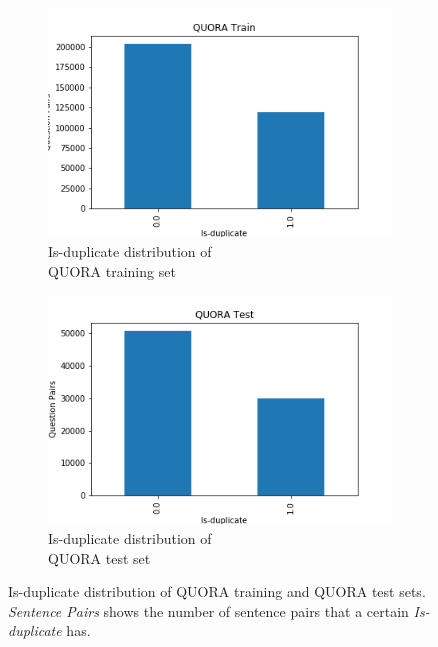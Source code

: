 \begin{enumerate}
 \begin{figure}
 	\captionsetup[subfigure]{justification=centering}
 	\centering
 	\begin{subfigure}[b]{.5\textwidth}
 		\centering
 		\includegraphics[width=\textwidth]{figures/semantic_textual_similarity/introduction/quora_train.png}
 		\caption{Is-duplicate distribution of \\ QUORA training set}
 		\label{fig:quora_train_is_duplicate}
 	\end{subfigure}%
 	\begin{subfigure}[b]{.5\textwidth}
 		\centering
 		\includegraphics[width=\textwidth]{figures/semantic_textual_similarity/introduction/quora_test.png}
 		\caption{Is-duplicate distribution of \\ QUORA test set}
 		\label{fig:quora_test_is_duplicate}
 	\end{subfigure}
 	\caption[Is-duplicate distribution of QUORA training and QUORA test sets]{Is-duplicate distribution of QUORA training and QUORA test sets. \textit{Sentence Pairs} shows the number of sentence pairs that a certain \textit{Is-duplicate} has.}
 	\label{fig:quora_is_duplicate}
 \end{figure}
   


\end{enumerate}
